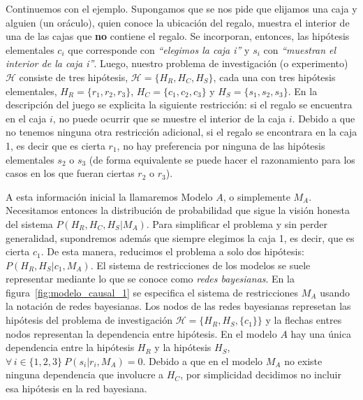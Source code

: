 \documentclass[a4paper,11pt]{book}
\theoremstyle{definition}
\begin{document}

Continuemos con el ejemplo.
%
Supongamos que se nos pide que elijamos una caja y alguien (un or\'aculo), quien conoce la ubicaci\'on del regalo, muestra el interior de una de las cajas que \textbf{no} contiene el regalo.
%
Se incorporan, entonces, las hip\'otesis elementales $c_i$ que corresponde con \emph{``elegimos la caja i''} y $s_i$ con \emph{``muestran el interior de la caja i''}.
%
Luego, nuestro problema de investigaci\'on (o experimento) $\mathcal{H}$ consiste de tres hip\'otesis, $\mathcal{H} = \{H_R, H_C, H_S\}$, cada una con tres hip\'otesis elementales, $H_R=\{r_1, r_2, r_3\}$, $H_C=\{c_1, c_2, c_3\}$ y $H_S=\{s_1, s_2, s_3\}$.
%
En la descripci\'on del juego se explicita la siguiente restricci\'on: si el regalo se encuentra en el caja $i$, no puede ocurrir que se muestre el interior de la caja $i$.
%
Debido a que no tenemos ninguna otra restricci\'on adicional, si el regalo se encontrara en la caja 1, es decir que es cierta $r_1$, no hay preferencia por ninguna de las hip\'otesis elementales $s_2$ o $s_3$ (de forma equivalente se puede hacer el razonamiento para los casos en los que fueran ciertas $r_2$ o $r_3$).


A esta informaci\'on inicial la llamaremos Modelo $A$, o simplemente $M_A$.
%
Necesitamos entonces la distribuci\'on de probabilidad que sigue la visi\'on honesta del sistema $P(H_R,H_C,H_S|M_A)$.
%
Para simplificar el problema y sin perder generalidad, supondremos adem\'as que siempre elegimos la caja 1, es decir,  que es cierta $c_1$. 
De esta manera, reducimos el problema a solo dos hip\'otesis: $P(H_R,H_S|c_1, M_A)$.
%
El sistema de restricciones de los modelos se suele representar mediante lo que se conoce como \emph{redes bayesianas}.
%
En la figura~\ref{fig:modelo_causal_1} se especifica el sistema de restricciones $M_A$ usando la notaci\'on de redes bayesianas.
%
Los nodos de las redes bayesianas represetan las hip\'otesis del problema de investigaci\'on $\mathcal{H} = \{H_R, H_S, \{c_1\}\}$ y la flechas entres nodos representan la dependencia entre hip\'otesis.
%
En el modelo $A$ hay una \'unica dependencia entre la hip\'otesis $H_R$ y la hip\'otesis $H_S$, $\forall\, i \in \{1,2,3\} \ P(s_i|r_i,M_A)=0$.
%
Debido a que en el modelo $M_A$ no existe ninguna dependencia que involucre a $H_C$, por simplicidad decidimos no incluir esa hip\'otesis en la red bayesiana.


\end{document}

